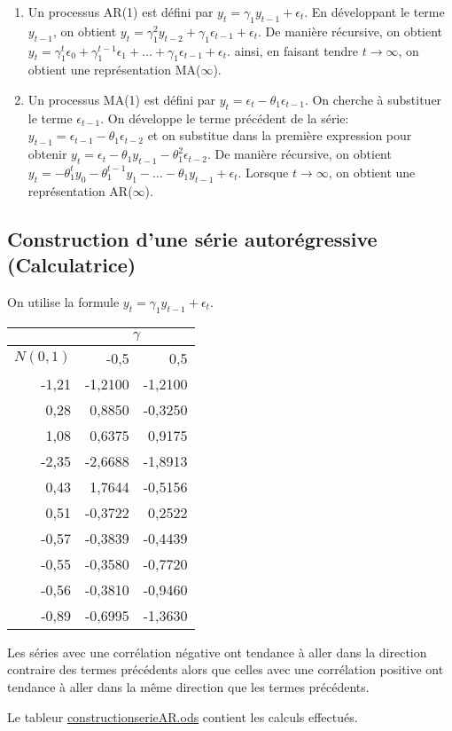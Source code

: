 \documentclass{article}
\begin{document}
\begin{enumerate}
\item Un processus AR(1) est défini par $y_t = \gamma_1y_{t-1} + \epsilon_t$. En développant le terme $y_{t-1}$, on obtient $y_t = \gamma_1^2y_{t-2}+\gamma_1\epsilon_{t-1}+\epsilon_t$. De manière récursive, on obtient $y_t = \gamma_1^{t}\epsilon_0 + \gamma_1^{t-1}\epsilon_1 + \ldots + \gamma_1\epsilon_{t-1} + \epsilon_t$. ainsi, en faisant tendre $t\to\infty$, on obtient une représentation MA($\infty$).
  
\item Un processus MA(1) est défini par $y_t = \epsilon_t - \theta_1\epsilon_{t-1}$. On cherche à substituer le terme $\epsilon_{t-1}$. On développe le terme précédent de la série: $y_{t-1} = \epsilon_{t-1} - \theta_1\epsilon_{t-2}$ et on substitue dans la première expression pour obtenir $y_t = \epsilon_t - \theta_1y_{t-1} - \theta_1^2\epsilon_{t-2}$. De manière récursive, on obtient $y_t = -\theta_1^ty_0-\theta_1^{t-1}y_1-\ldots-\theta_1y_{t-1}+\epsilon_{t}$. Lorsque $t\to\infty$, on obtient une représentation AR($\infty$).
\end{enumerate}


\clearpage
\subsection{Construction d'une série autorégressive (Calculatrice)}

On utilise la formule $y_t = \gamma_1y_{t-1} + \epsilon_t$.

\begin{center}
\begin{tabular}{|r|r|r|}
\hline
\multicolumn{1}{|l|}{} & \multicolumn{ 2}{c|}{$\gamma$} \\ \hline
\multicolumn{1}{|l|}{$N(0,1)$} & -0,5 & 0,5 \\ \hline
-1,21 & -1,2100 & -1,2100 \\ \hline
0,28 & 0,8850 & -0,3250 \\ \hline
1,08 & 0,6375 & 0,9175 \\ \hline
-2,35 & -2,6688 & -1,8913 \\ \hline
0,43 & 1,7644 & -0,5156 \\ \hline
0,51 & -0,3722 & 0,2522 \\ \hline
-0,57 & -0,3839 & -0,4439 \\ \hline
-0,55 & -0,3580 & -0,7720 \\ \hline
-0,56 & -0,3810 & -0,9460 \\ \hline
-0,89 & -0,6995 & -1,3630 \\ \hline
\end{tabular}
\end{center}

Les séries avec une corrélation négative ont tendance à aller dans la direction contraire des termes précédents alors que celles avec une corrélation positive ont tendance à aller dans la même direction que les termes précédents.

Le tableur \url{constructionserieAR.ods} contient les calculs effectués.

\clearpage


\end{document}
